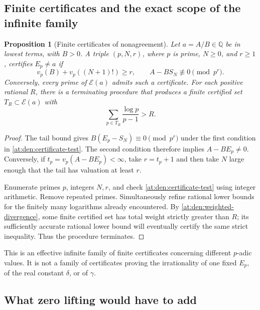 \documentclass[11pt,a4paper]{article}
\newcommand{\Q}{\mathbb Q}
\newtheorem{proposition}[theorem]{Proposition}
\theoremstyle{definition}
\theoremstyle{remark}
\numberwithin{equation}{section}
\begin{document}
\subsection{Finite certificates and the exact scope of the infinite family}

\begin{proposition}[Finite certificates of nonagreement]
\label{at:den:certificates}
Let $a=A/B\in\Q$ be in lowest terms, with $B>0$.  A triple
$(p,N,r)$, where $p$ is prime, $N\geq0$, and $r\geq1$, certifies
$E_p\ne a$ if
\begin{equation}\label{at:den:certificate-test}
 v_p(B)+v_p((N+1)!)\geq r,
 \qquad A-BS_N\not\equiv0\pmod{p^r}.
\end{equation}
Conversely, every prime of $\mathcal E(a)$ admits such a certificate.
For each positive rational $R$, there is a terminating procedure
that produces a finite certified set $T_R\subset\mathcal E(a)$ with
\begin{equation}\label{at:den:certificate-weight}
 \sum_{p\in T_R}\frac{\log p}{p-1}>R.
\end{equation}
\end{proposition}

\begin{proof}
The tail bound gives
$B(E_p-S_N)\equiv0\pmod{p^r}$ under the first condition in
\eqref{at:den:certificate-test}.  The second condition therefore implies
$A-BE_p\ne0$.  Conversely, if
$t_p=v_p(A-BE_p)<\infty$, take $r=t_p+1$ and then take $N$ large
enough that the tail has valuation at least $r$.

Enumerate primes $p$, integers $N,r$, and check
\eqref{at:den:certificate-test} using integer arithmetic.  Remove repeated
primes.  Simultaneously refine rational lower bounds for the finitely
many logarithms already encountered.  By
\eqref{at:den:weighted-divergence}, some finite certified set has total
weight strictly greater than $R$; its sufficiently accurate rational
lower bound will eventually certify the same strict inequality.
Thus the procedure terminates.
\end{proof}

This is an effective infinite family of finite certificates concerning
different $p$-adic values.  It is not a family of certificates proving
the irrationality of one fixed $E_p$, of the real constant $\delta$,
or of $\gamma$.

\subsection{What zero lifting would have to add}
\end{document}
